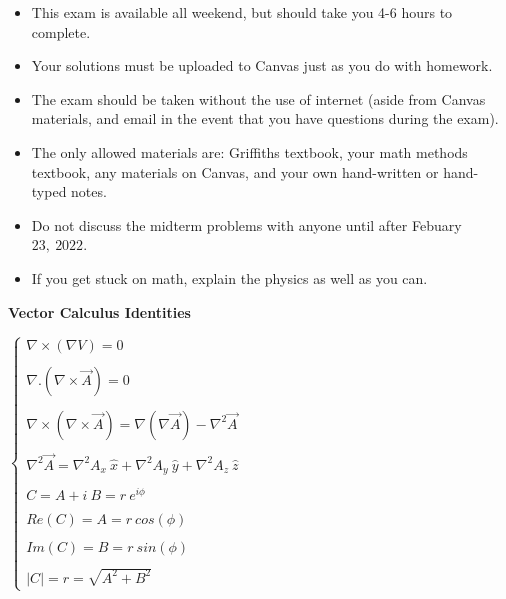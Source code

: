 \documentclass[fleqn]{article}
\begin{document}
  \begin{itemize}
    \item This exam is available all weekend, but should take you 4-6 hours to complete.
    \item Your solutions must be uploaded to Canvas just as you do with homework.
    \item The exam should be taken without the use of internet (aside from Canvas materials, and email
    in the event that you have questions during the exam).
    \item The only allowed materials are: Griffiths textbook, your math methods textbook, any materials
    on Canvas, and your own hand-written or hand-typed notes.
    \item Do not discuss the midterm problems with anyone until after Febuary $23, ~ 2022$.
    \item If you get stuck on math, explain the physics as well as you can.
  \end{itemize}

  \pagebreak

  \textbf{Vector Calculus Identities}

  \vspace{1cm}

  $
    \begin{cases}
      \nabla \times \left(\nabla V\right)=0
      \\
      \\
      \nabla.\left(\nabla \times \overrightarrow{A}\right)=0
      \\
      \\
      \nabla \times \left(\nabla \times \overrightarrow{A}\right)=\nabla\left(\nabla \overrightarrow{A}\right)-\nabla^2 \overrightarrow{A}
      \\
      \\
      \nabla^2 \overrightarrow{A}=\nabla^2 A_x ~ \hat{x}+\nabla^2 A_y ~ \hat{y}+\nabla^2 A_z ~ \hat{z}
      \\
      \\
      C=A+i ~ B=r ~ e^{i \phi}
      \\
      \\
      Re(C)=A=r ~ cos(\phi)
      \\
      \\
      Im(C)=B=r ~ sin(\phi)
      \\
      \\
      |C|=r=\sqrt{A^2+B^2}
    \end{cases}
  $
\end{document}
